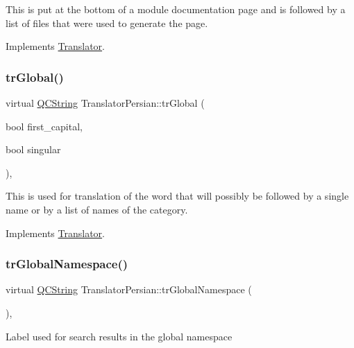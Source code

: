 This is put at the bottom of a module documentation page and is followed by a list of files that were used to generate the page. 

Implements \mbox{\hyperlink{class_translator}{Translator}}.

\mbox{\label{class_translator_persian_a2110cb861f7c4e8237c6de68e5df714a}} 
\subsubsection{\texorpdfstring{trGlobal()}{trGlobal()}}
{\footnotesize\ttfamily virtual \mbox{\hyperlink{class_q_c_string}{Q\+C\+String}} Translator\+Persian\+::tr\+Global (\begin{DoxyParamCaption}\item[{bool}]{first\+\_\+capital,  }\item[{bool}]{singular }\end{DoxyParamCaption})\hspace{0.3cm}{\ttfamily [inline]}, {\ttfamily [virtual]}}

This is used for translation of the word that will possibly be followed by a single name or by a list of names of the category. 

Implements \mbox{\hyperlink{class_translator}{Translator}}.

\mbox{\label{class_translator_persian_a74d0965e05e6063668a776e2d02bc954}} 
\subsubsection{\texorpdfstring{trGlobalNamespace()}{trGlobalNamespace()}}
{\footnotesize\ttfamily virtual \mbox{\hyperlink{class_q_c_string}{Q\+C\+String}} Translator\+Persian\+::tr\+Global\+Namespace (\begin{DoxyParamCaption}{ }\end{DoxyParamCaption})\hspace{0.3cm}{\ttfamily [inline]}, {\ttfamily [virtual]}}

Label used for search results in the global namespace 

